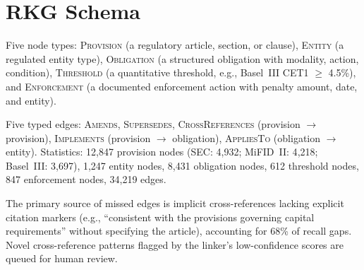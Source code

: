 \documentclass[11pt]{article}
\begin{document}
\section{RKG Schema}
\label{app:kg}

Five node types: \textsc{Provision} (a regulatory article, section, or clause), \textsc{Entity} (a regulated entity type), \textsc{Obligation} (a structured obligation with modality, action, condition), \textsc{Threshold} (a quantitative threshold, e.g., Basel~III CET1 $\geq$ 4.5\%), and \textsc{Enforcement} (a documented enforcement action with penalty amount, date, and entity).

Five typed edges: \textsc{Amends}, \textsc{Supersedes}, \textsc{CrossReferences} (provision $\rightarrow$ provision), \textsc{Implements} (provision $\rightarrow$ obligation), \textsc{AppliesTo} (obligation $\rightarrow$ entity). Statistics: 12{,}847 provision nodes (SEC: 4{,}932; MiFID~II: 4{,}218; Basel~III: 3{,}697), 1{,}247 entity nodes, 8{,}431 obligation nodes, 612 threshold nodes, 847 enforcement nodes, 34{,}219 edges.

The primary source of missed edges is implicit cross-references lacking explicit citation markers (e.g., ``consistent with the provisions governing capital requirements'' without specifying the article), accounting for 68\% of recall gaps. Novel cross-reference patterns flagged by the linker's low-confidence scores are queued for human review.
\end{document}
